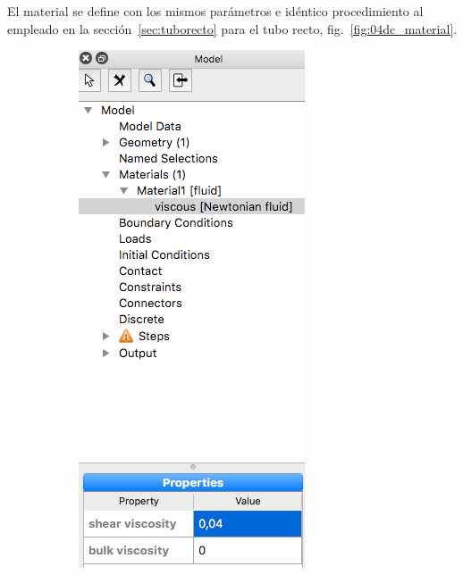 El material se define con los mismos parámetros e idéntico procedimiento al empleado en la sección~\ref{sec:tuborecto} para el tubo recto, fig.~\ref{fig:04dc_material}.
\begin{figure}[!ht]
\centering
\begin{subfigure}[b]{0.25\textwidth}
\centering
\includegraphics[width=\linewidth]{figuras_4/04d_material.png}

\end{subfigure}
\end{figure}
